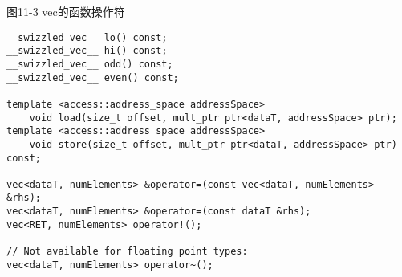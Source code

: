 \hspace*{\fill} \par %
图11-3 vec的函数操作符
\begin{lstlisting}[caption={}]
__swizzled_vec__ lo() const; 
__swizzled_vec__ hi() const; 
__swizzled_vec__ odd() const; 
__swizzled_vec__ even() const; 

template <access::address_space addressSpace> 
	void load(size_t offset, mult_ptr ptr<dataT, addressSpace> ptr); 
template <access::address_space addressSpace>
	void store(size_t offset, mult_ptr ptr<dataT, addressSpace> ptr) const;
	
vec<dataT, numElements> &operator=(const vec<dataT, numElements> &rhs);
vec<dataT, numElements> &operator=(const dataT &rhs); 
vec<RET, numElements> operator!(); 

// Not available for floating point types:
vec<dataT, numElements> operator~();
\end{lstlisting}


